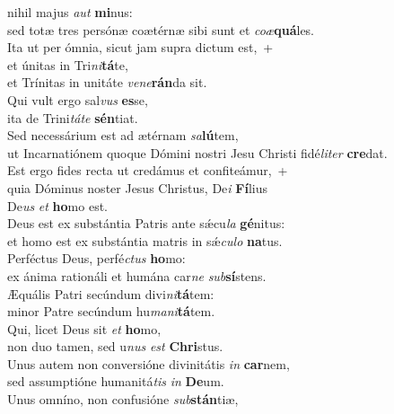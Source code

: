 \evenverse  nihil majus \textit{aut} \textbf{mi}nus:~\*\\
\evenverse sed totæ tres persónæ coætérnæ sibi sunt et \textit{co}\textit{æ}\textbf{quá}les.\\
\oddverse Ita ut per ómnia, sicut jam supra dictum est,~+\\
\oddverse  et únitas in Tri\textit{ni}\textbf{tá}te,~\*\\
\oddverse et Trínitas in unitáte \textit{ve}\textit{ne}\textbf{rán}da sit.\\
\evenverse Qui vult ergo sal\textit{vus} \textbf{es}se,~\*\\
\evenverse ita de Trini\textit{tá}\textit{te} \textbf{sén}tiat.\\
\oddverse Sed necessárium est ad ætérnam \textit{sa}\textbf{lú}tem,~\*\\
\oddverse ut Incarnatiónem quoque Dómini nostri Jesu Christi fidé\textit{li}\textit{ter} \textbf{cre}dat.\\
\evenverse Est ergo fides recta ut credámus et confiteámur,~+\\
\evenverse  quia Dóminus noster Jesus Christus, De\textit{i} \textbf{Fí}lius~\*\\
\evenverse De\textit{us} \textit{et} \textbf{ho}mo est.\\
\oddverse Deus est ex substántia Patris ante sǽcu\textit{la} \textbf{gé}nitus:~\*\\
\oddverse et homo est ex substántia matris in sǽ\textit{cu}\textit{lo} \textbf{na}tus.\\
\evenverse Perféctus Deus, perfé\textit{ctus} \textbf{ho}mo:~\*\\
\evenverse ex ánima rationáli et humána car\textit{ne} \textit{sub}\textbf{sí}stens.\\
\oddverse Æquális Patri secúndum divi\textit{ni}\textbf{tá}tem:~\*\\
\oddverse minor Patre secúndum hu\textit{ma}\textit{ni}\textbf{tá}tem.\\
\evenverse Qui, licet Deus sit \textit{et} \textbf{ho}mo,~\*\\
\evenverse non duo tamen, sed u\textit{nus} \textit{est} \textbf{Chri}stus.\\
\oddverse Unus autem non conversióne divinitátis \textit{in} \textbf{car}nem,~\*\\
\oddverse sed assumptióne humanitá\textit{tis} \textit{in} \textbf{De}um.\\
\evenverse Unus omníno, non confusióne \textit{sub}\textbf{stán}tiæ,~\*\\
